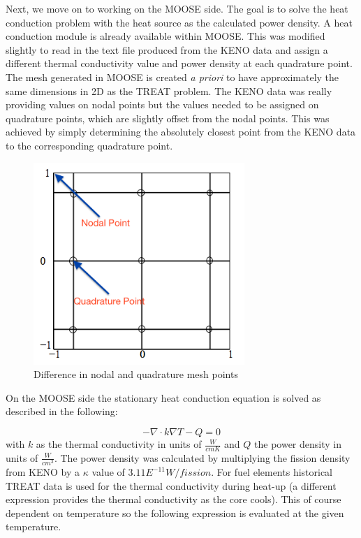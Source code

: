 \documentclass[11pt]{article}
\begin{document}
	Next, we move on to working on the MOOSE side.  The goal is to solve the heat conduction problem with the heat source as the calculated power density. A heat conduction module is already available within MOOSE.  This was modified slightly to read in the text file produced from the KENO data and assign a different thermal conductivity value and power density at each quadrature point.  The mesh generated in MOOSE is created \emph{a priori} to have approximately the same dimensions in 2D as the TREAT problem.  The KENO data was really providing values on nodal points but the values needed to be assigned on quadrature points, which are slightly offset from the nodal points.  This was achieved by simply determining the absolutely closest point from the KENO data to the corresponding quadrature point. 
	
\begin{figure}
    \centering
    \includegraphics[width=8cm]{figures/nodalvsquad.png}
    \caption{Difference in nodal and quadrature mesh points}
    \label{fig:nodalquad}
\end{figure}

On the MOOSE side the stationary heat conduction equation is solved as described in the following:

\begin{equation}
    -\nabla \cdot k\nabla T - Q = 0
\end{equation}
with $k$ as the thermal conductivity in units of $\frac{W}{cm K}$  and $Q$ the power density in units of $\frac{W}{cm^3}$. The power density was calculated by multiplying the fission density from KENO by a $\kappa$ value of $3.11E^{-11} W/fission$. For fuel elements historical TREAT data is used for the thermal conductivity during heat-up (a different expression provides the thermal conductivity as the core cools).  This of course dependent on temperature so the following expression is evaluated at the given temperature.
\end{document}
